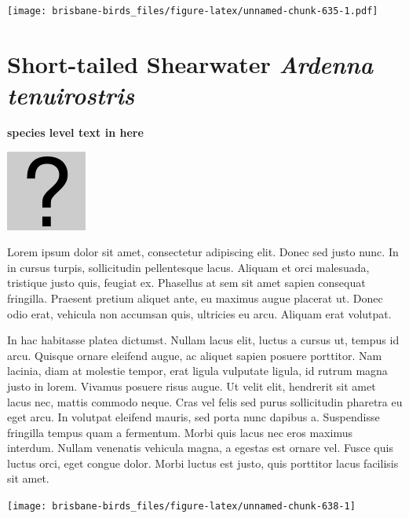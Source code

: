 \documentclass[]{book}
\let\origfigure\figure
\let\endorigfigure\endfigure
\renewenvironment{figure}[1][2] {
  \expandafter\origfigure\expandafter[H]
} {
  \endorigfigure
}
\begin{document}
\begin{figure}
\centering
\texttt{[image: brisbane-birds\_files/figure-latex/unnamed-chunk-635-1.pdf]}
\caption{\label{fig:unnamed-chunk-635}insert figure caption}
\end{figure}

\section{\texorpdfstring{Short-tailed Shearwater \emph{Ardenna
tenuirostris}}{Short-tailed Shearwater Ardenna tenuirostris}}\label{short-tailed-shearwater-ardenna-tenuirostris}

\textbf{species level text in here}

\begin{figure}
\centering
\includegraphics{assets/missing.png}
\caption{No image for species}
\end{figure}

Lorem ipsum dolor sit amet, consectetur adipiscing elit. Donec sed justo
nunc. In in cursus turpis, sollicitudin pellentesque lacus. Aliquam et
orci malesuada, tristique justo quis, feugiat ex. Phasellus at sem sit
amet sapien consequat fringilla. Praesent pretium aliquet ante, eu
maximus augue placerat ut. Donec odio erat, vehicula non accumsan quis,
ultricies eu arcu. Aliquam erat volutpat.

In hac habitasse platea dictumst. Nullam lacus elit, luctus a cursus ut,
tempus id arcu. Quisque ornare eleifend augue, ac aliquet sapien posuere
porttitor. Nam lacinia, diam at molestie tempor, erat ligula vulputate
ligula, id rutrum magna justo in lorem. Vivamus posuere risus augue. Ut
velit elit, hendrerit sit amet lacus nec, mattis commodo neque. Cras vel
felis sed purus sollicitudin pharetra eu eget arcu. In volutpat eleifend
mauris, sed porta nunc dapibus a. Suspendisse fringilla tempus quam a
fermentum. Morbi quis lacus nec eros maximus interdum. Nullam venenatis
vehicula magna, a egestas est ornare vel. Fusce quis luctus orci, eget
congue dolor. Morbi luctus est justo, quis porttitor lacus facilisis sit
amet.

\begin{figure}
\texttt{[image: brisbane-birds\_files/figure-latex/unnamed-chunk-638-1]} \caption{insert figure caption}\label{fig:unnamed-chunk-638}
\end{figure}
\end{document}
